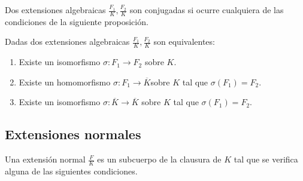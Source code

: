 \begin{definition}
Dos extensiones algebraicas $\frac{F_1}{K},\frac{F_2}{K}$ son conjugadas si ocurre cualquiera de las condiciones de la siguiente proposición. 
\end{definition}

\begin{proposition}
Dadas dos extensiones algebraicas $\frac{F_1}{K},\frac{F_2}{K}$ son equivalentes:

\begin{enumerate}
\item Existe un isomorfismo $\sigma:F_1 \to F_2$ sobre $K$. 
\item Existe un homomorfismo $\sigma:F_1 \to \overline{K}$sobre $K$ tal que $\sigma(F_1) = F_2$.
\item Existe un isomorfismo $\sigma:\overline{K} \to \overline{K}$ sobre $K$ tal que $\sigma(F_1) = F_2$. 
\end{enumerate}
\end{proposition}

\subsection{Extensiones normales}

\begin{definition}
Una extensión normal $\frac{F}{K}$ es un subcuerpo de la clausura de $K$ tal que se verifica alguna de las siguientes condiciones.
\end{definition}

